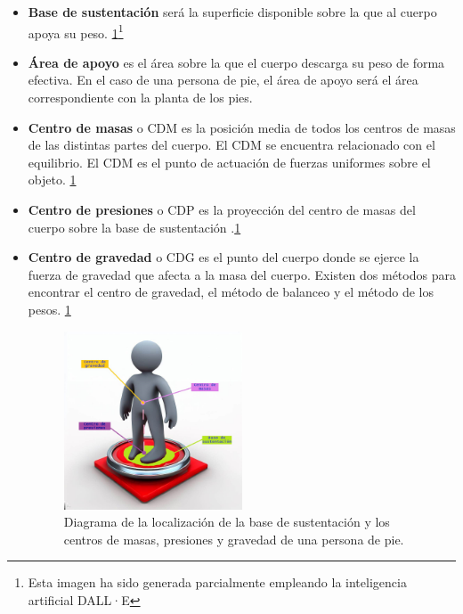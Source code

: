 \begin{itemize}
    \item \textbf{Base de sustentación} será la superficie disponible sobre la que al cuerpo apoya su peso. \ref{fig:persona}\footnote{Esta imagen ha sido generada parcialmente empleando la inteligencia artificial DALL·E}
    \item \textbf{Área de apoyo} es el área sobre la que el cuerpo descarga su peso de forma efectiva. En el caso de una persona de pie, el área de apoyo será el área correspondiente con la planta de los pies.
    \item \textbf{Centro de masas} \cite{CDM} o CDM es la posición media de todos los centros de masas de las distintas partes del cuerpo. El CDM se encuentra relacionado con el equilibrio. El CDM es el punto de actuación de fuerzas uniformes sobre el objeto. \ref{fig:persona}
    \item \textbf{Centro de presiones} o CDP es la proyección del centro de masas del cuerpo sobre la base de sustentación .\ref{fig:persona}
    \item \textbf{Centro de gravedad} o CDG es el punto del cuerpo donde se ejerce la fuerza de gravedad que afecta a la masa del cuerpo. Existen dos métodos para encontrar el centro de gravedad, el método de balanceo y el método de los pesos. \ref{fig:persona}%

\begin{figure}[h!]
    \centering
    \includegraphics[width=0.5\textwidth]{img/IA_Persona.jpeg}
    \caption{Diagrama de la localización de la base de sustentación y los centros de masas, presiones y gravedad de una persona de pie.}
    \label{fig:persona} %
\end{figure}
    

\end{itemize}
